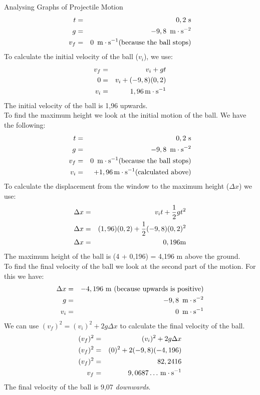 \begin{wex}{Analysing Graphs of Projectile Motion}
{\begin{eqnarray*}
t &=& 0,2\text{ s}\\
g &=& -9,8~\,\mathrm{m \cdot s^{-2}}\\
v_f &=& 0~\,\mathrm{m \cdot s^{-1}} \text{(because~the~ball~stops)}
\end{eqnarray*}
To calculate the initial velocity of the ball ($v_i$), we use:
\begin{eqnarray*}
v_f &=& v_i + gt\\
0 &=& v_i + (-9,8)(0,2)\\
v_i &=& 1,96 \,\mathrm{m \cdot s^{-1}}
\end{eqnarray*}
The initial velocity of the ball is 1,96 \ms upwards.\\

To find the maximum height we look at the initial motion of the ball. We have the following:
\begin{eqnarray*}
t &=& 0,2~\rm{s}\\
g &=& -9,8~\,\mathrm{m \cdot s^{-2}}\\
v_f &=& 0~\,\mathrm{m \cdot s^{-1}} \rm{(because~the~ball~stops)}\\
v_i &=& +1,96 \,\mathrm{m \cdot s^{-1}} \rm{(calculated~above)}
\end{eqnarray*}
To calculate the displacement from the window to the maximum height ($\Delta x$) we use:
\begin{eqnarray*}
\Delta x &=& v_it + \frac{1}{2}gt^2\\
\Delta x &=& (1,96)(0,2) + \frac{1}{2}(-9,8)(0,2)^2\\
\Delta x &=& 0,196 \rm{m}\\
\end{eqnarray*}
The maximum height of the ball is (4 + 0,196) = 4,196 m above the ground.\\

To find the final velocity of the ball we look at the second part of the motion. For this we have:
\begin{eqnarray*}
\Delta x &=& -4,196~\rm{m} \rm~({because~upwards~is~positive})\\
g &=& -9,8~\,\mathrm{m \cdot s^{-2}}\\
v_i &=& 0~\,\mathrm{m \cdot s^{-1}}
\end{eqnarray*}
We can use $(v_f)^2 = (v_i)^2 + 2g\Delta x$ to calculate the final velocity of the ball.
\begin{eqnarray*}
(v_f)^2 &=& (v_i)^2 + 2g\Delta x\\
(v_f)^2 &=& (0)^2 + 2(-9,8)(-4,196)\\
(v_f)^2 &=& 82,2416\\
v_f &=& 9,0687\ldots \,\mathrm{m \cdot s^{-1}}\\
\end{eqnarray*}
The final velocity of the ball is 9,07 \ms \textit{downwards}.
}
\end{wex}

